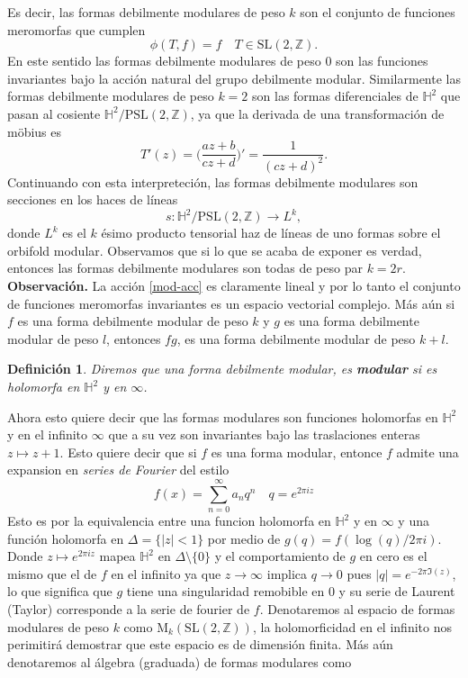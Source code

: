 \documentclass[letterpaper]{article}
\newtheorem{def.}{Definici\'on}[section]
\newcommand{\obs}{{\newline \noindent \sc \textbf{Observación. }}}
\newcommand{\pslz}{\ensuremath{\mathrm{PSL}(2,\mathbb Z) }}
\newcommand{\hd}{\ensuremath{\mathbb H^2}}
\newcommand{\slz}{\ensuremath{\mathrm{SL}(2,\mathbb Z) }}
\newcommand{\mdlr}{\ensuremath{\mathrm{M}}}
\begin{document}
Es decir, las formas debilmente modulares de peso \(k\) son el conjunto de funciones meromorfas que cumplen
\[
    \phi(T,f)=f\quad T\in\slz.
\]
En este sentido las formas debilmente modulares de peso \(0\) son las funciones invariantes bajo la acción natural del grupo debilmente modular. Similarmente las formas debilmente modulares de peso \(k=2\) son las formas diferenciales de \(\hd\) que pasan al cosiente \(\hd/\pslz\), ya que la derivada de una transformación de möbius es
\[
    T'(z)=\Big(\frac{az+b}{cz+d}\Big)'=\frac{1}{(cz+d)^2}.
\]
Continuando con esta interpreteción, las formas debilmente modulares son secciones en los haces de líneas
\[
    s:\hd/\pslz\rightarrow L^{k},
\]
donde \(L^k\) es el \(k\) ésimo producto tensorial haz de líneas de uno formas sobre el orbifold modular. Observamos que si lo que se acaba de exponer es verdad, entonces las formas debilmente modulares son todas de peso par \(k=2r\).
\obs La acción \ref{mod-acc} es claramente lineal y por lo tanto el conjunto de funciones meromorfas invariantes es un espacio vectorial complejo. Más aún si \(f\) es una forma debilmente modular de peso \(k\) y \(g\) es una forma debilmente modular de peso \(l\), entonces \(fg\), es una forma debilmente modular de peso \(k+l\).
\begin{def.}
Diremos que una forma debilmente modular, es \textbf{modular} si es holomorfa en \(\hd\) y en \(\infty\).
\end{def.}
Ahora esto quiere decir que las formas modulares son funciones holomorfas en \(\hd\) y en el infinito \(\infty\) que a su vez son invariantes bajo las traslaciones enteras \(z\mapsto z+1\). Esto quiere decir que si \(f\) es una forma modular, entonce \(f\) admite una expansion en \emph{series de Fourier} del estilo
\[
    f(x)=\sum^{\infty}_{n=0}a_nq^{n}\quad q=e^{2\pi iz}
\]
Esto es por la equivalencia entre una funcion holomorfa en \(\hd\) y en \(\infty\) y una función holomorfa en \(\Delta=\{|z|< 1\}\) por medio de \(g(q)=f(\log(q)/2\pi i)\). Donde \(z\mapsto e^{2\pi i z}\) mapea \(\hd\) en \(\Delta\setminus\{0\}\) y el comportamiento de \(g\) en cero es el mismo que el de \(f\) en el infinito ya que \(z\rightarrow\infty\) implica \(q\rightarrow 0\) pues \(|q|=e^{-2\pi\Im(z)}\), lo que significa que \(g\) tiene una singularidad remobible en \(0\) y su serie de Laurent (Taylor) corresponde a la serie de fourier de \(f\).
Denotaremos al espacio de formas modulares de peso \(k\) como \(\mdlr_{k}(\slz)\), la holomorficidad en el infinito nos perimitirá demostrar que este espacio es de dimensión finita. Más aún denotaremos al álgebra (graduada) de formas modulares como
\end{document}
